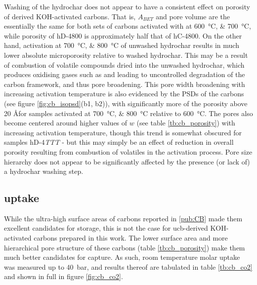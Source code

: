 Washing of the \gls{hydrochar} does not appear to have a consistent effect on porosity of derived KOH-activated carbons. That is,  $A_{BET}$ and pore volume are the essentially the same for both sets of carbons activated with  at \qtylist[list-units=single]{600;700}{\degreeCelsius}, while porosity of hD-4800 is approximately half that of hC-4800. On the other hand, activation at \qtylist[list-final-separator={or }, list-units=single]{700;800}{\degreeCelsius} of unwashed \gls{hydrochar} results in much lower absolute microporosity relative to washed \gls{hydrochar}. This may be a result of combustion of volatile compounds dried into the unwashed \gls{hydrochar}, which produces oxidising gases such as  and  leading to uncontrolled degradation of the carbon framework, and thus pore broadening.\citep{Sevilla2014Energy, Blankenship2022Modulating} This pore width broadening with increasing activation temperature is also evidenced by the PSDs of the carbons (see figure \ref{fig:cb_isopsd}(b1, b2)), with significantly more of the porosity above 20 \AA\space for samples activated at \qtylist[list-final-separator={or }, list-units=single]{700;800}{\degreeCelsius} relative to \qty{600}{\degreeCelsius}. The pores also become centered around higher values of $w$ (see table \ref{tb:cb_porosity}) with increasing activation temperature, though this trend is somewhat obscured for samples hD-4\textit{TTT} - but this may simply be an effect of reduction in overall porosity resulting from combustion of volatiles in the activation process. Pore size hierarchy does not appear to be significantly affected by the presence (or lack of) a \gls{hydrochar} washing step.

\subsection{\texorpdfstring{ uptake}{CO2 uptake}}

While the ultra-high surface areas of carbons reported in \ref{pub:CB} made them excellent candidates for  storage, this is not the case for \acrshort{ucb}-derived KOH-activated carbons prepared in this work. The lower surface area and more hierarchical pore structure of these carbons (table \ref{tb:cb_porosity}) make them much better candidates for  capture. As such, room temperature molar  uptake was measured up to \qty{40}{\bar}, and results thereof are tabulated in table \ref{tb:cb_co2} and shown in full in figure \ref{fig:cb_co2}. 

